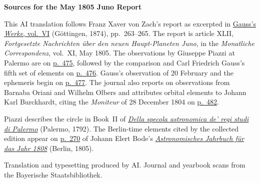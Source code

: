 \clearpage\thispagestyle{empty}
\begin{center}\textbf{Sources for the May 1805 Juno Report}\end{center}
\noindent This AI translation follows Franz Xaver von Zach’s report as excerpted in \href{https://gdz.sub.uni-goettingen.de/id/PPN236007467}{Gauss’s \textit{Werke}, vol.~VI} (Göttingen, 1874), pp.~263--265. The report is article XLII, \textit{Fortgesetzte Nachrichten über den neuen Haupt-Planeten Juno}, in the \textit{Monatliche Correspondenz}, vol.~XI, May 1805. The observations by Giuseppe Piazzi at Palermo are on \href{https://www.digitale-sammlungen.de/en/view/bsb10538603?page=489}{p.~475}, followed by the comparison and Carl Friedrich Gauss’s fifth set of elements on \href{https://www.digitale-sammlungen.de/en/view/bsb10538603?page=490}{p.~476}. Gauss’s observation of 20 February and the ephemeris begin on \href{https://www.digitale-sammlungen.de/en/view/bsb10538603?page=491}{p.~477}. The journal also reports on observations from Barnaba Oriani and Wilhelm Olbers and attributes orbital elements to Johann Karl Burckhardt, citing the \textit{Moniteur} of 28 December 1804 on \href{https://www.digitale-sammlungen.de/en/view/bsb10538603?page=496}{p.~482}.
\par\smallskip\noindent Piazzi describes the circle in Book~II of \href{https://www.e-rara.ch/zut/content/titleinfo/11884975}{\textit{Della specola astronomica de’ regi studi di Palermo}} (Palermo, 1792). The Berlin-time elements cited by the collected edition appear on \href{https://www.digitale-sammlungen.de/en/view/bsb10538337?page=280}{p.~270} of Johann Elert Bode’s \href{https://www.digitale-sammlungen.de/en/view/bsb10538337?page=7}{\textit{Astronomisches Jahrbuch für das Jahr 1808}} (Berlin, 1805).
\par\smallskip\noindent Translation and typesetting produced by AI. Journal and yearbook scans from the Bayerische Staatsbibliothek.
\clearpage

